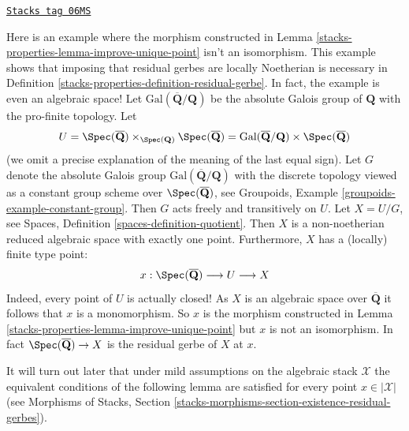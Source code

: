 \begin{example}[Distinct]
\label{stacks-properties-example-distinct}
\href{https://stacks.math.columbia.edu/tag/06MS}{\texttt{Stacks tag 06MS}}

Here is an example where the morphism constructed in
Lemma \ref{stacks-properties-lemma-improve-unique-point}
isn't an isomorphism. This example shows that imposing
that residual gerbes are locally Noetherian is necessary in
Definition \ref{stacks-properties-definition-residual-gerbe}.
In fact, the example is even an algebraic space!
Let $\text{Gal}(\overline{\mathbf{Q}}/\mathbf{Q})$ be the absolute
Galois group of $\mathbf{Q}$ with the pro-finite topology.
Let
$$
U =
\Spec(\overline{\mathbf{Q}})
\times_{\Spec(\mathbf{Q})}
\Spec(\overline{\mathbf{Q}}) =
\text{Gal}(\overline{\mathbf{Q}}/\mathbf{Q}) \times
\Spec(\overline{\mathbf{Q}})
$$
(we omit a precise explanation of the meaning of the last equal sign).
Let $G$ denote the absolute Galois group
$\text{Gal}(\overline{\mathbf{Q}}/\mathbf{Q})$ with the discrete
topology viewed as a constant group scheme over
$\Spec(\overline{\mathbf{Q}})$, see
Groupoids, Example \ref{groupoids-example-constant-group}.
Then $G$ acts freely and transitively on $U$.
Let $X = U/G$, see
Spaces, Definition \ref{spaces-definition-quotient}.
Then $X$ is a non-noetherian reduced algebraic space with exactly one point.
Furthermore, $X$ has a (locally) finite type point:
$$
x :
\Spec(\overline{\mathbf{Q}}) \longrightarrow
U \longrightarrow X
$$
Indeed, every point of $U$ is actually closed!
As $X$ is an algebraic space over $\overline{\mathbf{Q}}$
it follows that $x$ is a monomorphism. So $x$ is the morphism
constructed in
Lemma \ref{stacks-properties-lemma-improve-unique-point}
but $x$ is not an isomorphism. In fact
$\Spec(\overline{\mathbf{Q}}) \to X$ is the residual gerbe of $X$ at $x$.
\end{example}

It will turn out later that under mild assumptions on the algebraic stack
$\mathcal{X}$ the equivalent conditions of the following lemma are satisfied
for every point $x \in |\mathcal{X}|$ (see Morphisms of Stacks, Section
\ref{stacks-morphisms-section-existence-residual-gerbes}).

